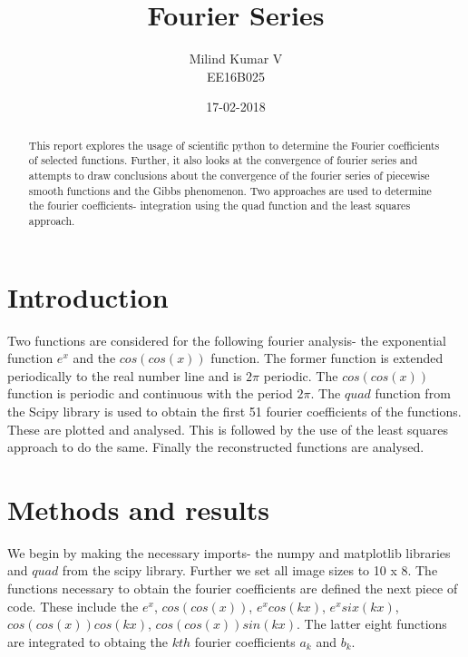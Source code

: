 \documentclass[a4paper, 12pt, margin= 1.25cm ]{article}
\title{Fourier Series}
\date{17-02-2018}
\author{Milind Kumar V\\ EE16B025}
\begin{document}
    
    
    \maketitle
    
 \begin{multicols}{2}   

    \begin{abstract}
    

This report explores the usage of scientific python to determine the
Fourier coefficients of selected functions. Further, it also looks at
the convergence of fourier series and attempts to draw conclusions about
the convergence of the fourier series of piecewise smooth functions and
the Gibbs phenomenon. Two approaches are used to determine the fourier
coefficients- integration using the quad function and the least squares
approach.
    \end{abstract}
    \section{Introduction}\label{introduction}

Two functions are considered for the following fourier analysis- the
exponential function $e^x$ and the $cos(cos(x))$ function. The former
function is extended periodically to the real number line and is $2\pi$
periodic. The $cos(cos(x))$ function is periodic and continuous with the
period $2\pi$. The $quad$ function from the Scipy library is used to
obtain the first 51 fourier coefficients of the functions. These are
plotted and analysed. This is followed by the use of the least squares
approach to do the same. Finally the reconstructed functions are
analysed.

    \section{Methods and results}\label{methods-and-results}

We begin by making the necessary imports- the numpy and matplotlib
libraries and $quad$ from the scipy library. Further we set all image
sizes to 10 x 8. The functions necessary to obtain the fourier
coefficients are defined the next piece of code. These include the
$e^x$, $cos(cos(x))$, $e^{x}cos(kx)$, $e^{x}six(kx)$,
$cos(cos(x))cos(kx)$, $cos(cos(x))sin(kx)$. The latter eight functions
are integrated to obtaing the $kth$ fourier coefficients $a_k$ and
$b_k$.

\end{multicols}
\end{document}
